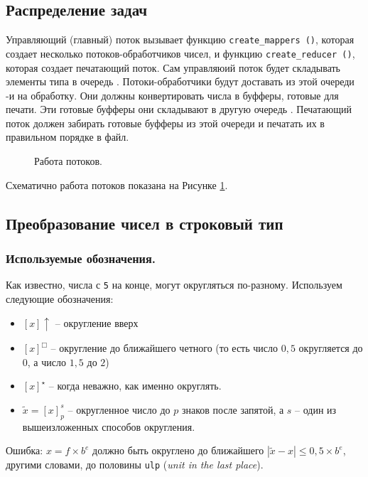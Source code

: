 \documentclass[a4paper, 12pt, twoside]{article}
\begin{document}
\subsection{Распределение задач}
Управляющий (главный) поток \texttt{} вызывает функцию \texttt{create\_mappers ()}, которая создает несколько потоков-обработчиков чисел, и функцию \texttt{create\_reducer ()}, которая создает печатающий поток.
Сам управляюий поток будет складывать элементы типа \texttt{} в очередь \texttt{}.
Потоки-обработчики будут доставать из этой очереди \texttt{}-и на обработку.
Они должны конвертировать числа в буфферы, готовые для печати.
Эти готовые буфферы \texttt{} они складывают в другую очередь \texttt{}.
Печатающий поток должен забирать готовые буфферы из этой очереди и печатать их в правильном порядке в файл.
\begin{figure}[h!]
\def\svgwidth{430pt}
  
  \caption{Работа потоков.} \label{draw}
\end{figure}

Схематично работа потоков показана на Рисунке \ref{draw}.

\subsection{Преобразование чисел в строковый тип}
\subsubsection{Используемые обозначения.}
Как известно, числа с \texttt{5} на конце, могут округляться по-разному.
Используем следующие обозначения:
\begin{itemize}
\item $[x]\uparrow$ -- округление вверх
\item $[x]^\Box$ -- округление до ближайшего четного (то есть число $0,5$ округляется до $0$, а число $1,5$ до $2$)
\item $[x]^\star$ -- когда неважно, как именно округлять.
\item $\tilde x = \left[ x \right]_p^s$ -- округленное число до $p$ знаков после запятой, а $s$ -- один из вышеизложенных способов округления.
\end{itemize}

Ошибка: $x=f \times b^e$ должно быть округлено до ближайшего $|\tilde x - x| \leqslant 0,5 \times b^e$, другими словами, до половины \texttt{ulp} (\textit{unit in the last place}).
\end{document}
